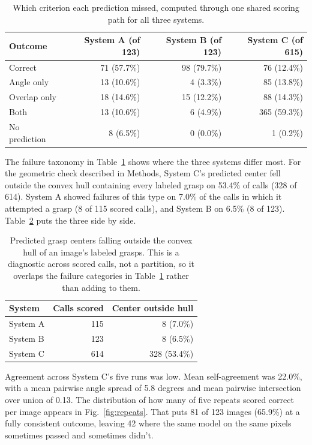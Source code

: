 \documentclass[12pt,letterpaper]{article}
\begin{document}
\begin{table}[H]
\centering
\caption{Which criterion each prediction missed, computed through one
shared scoring path for all three systems.}
\label{tab:taxonomy}
\begin{tabular}{lrrr}
\toprule
Outcome & System A (of 123) & System B (of 123) & System C (of 615) \\
\midrule
Correct       & 71 (57.7\%) & 98 (79.7\%) & 76 (12.4\%) \\
Angle only    & 13 (10.6\%) &  4 (3.3\%)  & 85 (13.8\%) \\
Overlap only  & 18 (14.6\%) & 15 (12.2\%) & 88 (14.3\%) \\
Both          & 13 (10.6\%) &  6 (4.9\%)  & 365 (59.3\%) \\
No prediction &  8 (6.5\%)  &  0 (0.0\%)  & 1 (0.2\%) \\
\bottomrule
\end{tabular}
\end{table}

The failure taxonomy in Table~\ref{tab:taxonomy} shows where the three
systems differ most. For the geometric check described in Methods,
System C's predicted center fell outside the convex hull containing
every labeled grasp on 53.4\% of calls (328 of 614). System A showed
failures of this type on 7.0\% of the calls in which it attempted a
grasp (8 of 115 scored calls), and System B on 6.5\% (8 of 123).
Table~\ref{tab:hull} puts the three side by side.

\begin{table}[H]
\centering
\caption{Predicted grasp centers falling outside the convex hull of an
image's labeled grasps. This is a diagnostic across scored calls, not a
partition, so it overlaps the failure categories in
Table~\ref{tab:taxonomy} rather than adding to them.}
\label{tab:hull}
\begin{tabular}{lrr}
\toprule
System & Calls scored & Center outside hull \\
\midrule
System A &  115 &   8 (7.0\%)  \\
System B &  123 &   8 (6.5\%)  \\
System C &  614 & 328 (53.4\%) \\
\bottomrule
\end{tabular}
\end{table}

Agreement across System C's five runs was low. Mean self-agreement was
22.0\%, with a mean pairwise angle spread of 5.8 degrees and mean
pairwise intersection over union of 0.13. The distribution of how many
of five repeats scored correct per image appears in
Fig.~\ref{fig:repeats}. That puts 81 of 123 images (65.9\%) at a fully
consistent outcome, leaving 42 where the same model on the same pixels
sometimes passed and sometimes didn't.
\end{document}
